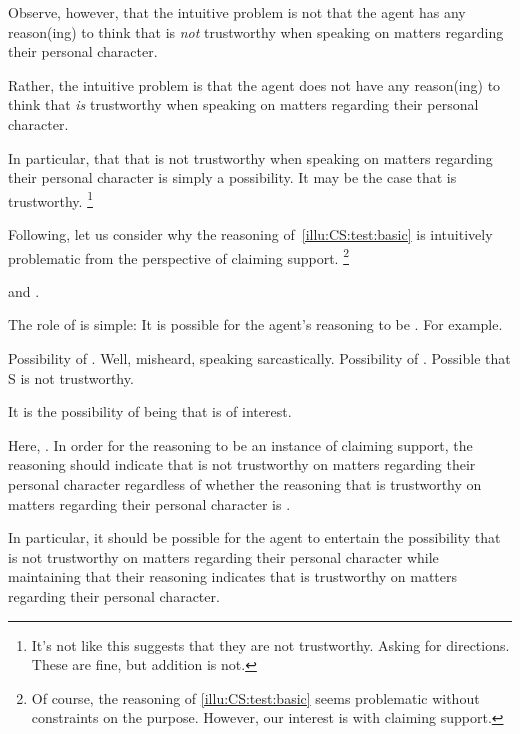 \begin{note}
  Observe, however, that the intuitive problem is not that the agent has any reason(ing) to think that  is \emph{not} trustworthy when speaking on matters regarding their personal character.

  Rather, the intuitive problem is that the agent does not have any reason(ing) to think that  \emph{is} trustworthy when speaking on matters regarding their personal character.

  In particular, that that  is not trustworthy when speaking on matters regarding their personal character is simply a possibility.
  It may be the case that  is trustworthy.\nolinebreak
  \footnote{
    \color{red}
    It's not like this suggests that they are not trustworthy.
    Asking for directions.
    These are fine, but addition is not.
  }
\end{note}

\begin{note}
  Following, let us consider why the reasoning of~\autoref{illu:CS:test:basic} is intuitively problematic from the perspective of claiming support.\nolinebreak
  \footnote{
    Of course, the reasoning of \autoref{illu:CS:test:basic} seems problematic without constraints on the purpose.
    However, our interest is with claiming support.
  }

  \ideaCSA{} and \ideaCSB{}.

  The role of \ideaCSA{} is simple: It is possible for the agent's reasoning to be \mom{}.
  For example.

  Possibility of \mistaken{}.
  Well, misheard, speaking sarcastically.
  Possibility of \misled{}.
  Possible that S is not trustworthy.

  It is the possibility of being \misled{} that is of interest.

  Here, \ideaCSB{}.
  In order for the reasoning to be an instance of claiming support, the reasoning should indicate that  is not trustworthy on matters regarding their personal character regardless of whether the reasoning that  is trustworthy on matters regarding their personal character is \mom{}.

  In particular, it should be possible for the agent to entertain the possibility that  is not trustworthy on matters regarding their personal character while maintaining that their reasoning indicates that  is trustworthy on matters regarding their personal character.
\end{note}

